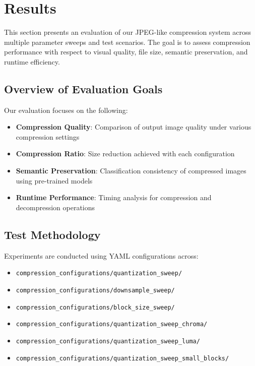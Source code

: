 \section{Results}
\label{sec:results}

This section presents an evaluation of our JPEG-like compression system across multiple parameter sweeps and test scenarios. The goal is to assess compression performance with respect to visual quality, file size, semantic preservation, and runtime efficiency.

\subsection{Overview of Evaluation Goals}
Our evaluation focuses on the following:
\begin{itemize}
    \item \textbf{Compression Quality}: Comparison of output image quality under various compression settings
    \item \textbf{Compression Ratio}: Size reduction achieved with each configuration
    \item \textbf{Semantic Preservation}: Classification consistency of compressed images using pre-trained models
    \item \textbf{Runtime Performance}: Timing analysis for compression and decompression operations
\end{itemize}

\subsection{Test Methodology}
Experiments are conducted using YAML configurations across:
\begin{itemize}
    \item \texttt{compression\_configurations/\allowbreak quantization\_sweep/}
    \item \texttt{compression\_configurations/\allowbreak downsample\_sweep/}
    \item \texttt{compression\_configurations/\allowbreak block\_size\_sweep/}
    \item \texttt{compression\_configurations/\allowbreak quantization\_sweep\_chroma/}
    \item \texttt{compression\_configurations/\allowbreak quantization\_sweep\_luma/}
    \item \texttt{compression\_configurations/\allowbreak quantization\_sweep\_small\_blocks/}
\end{itemize}

